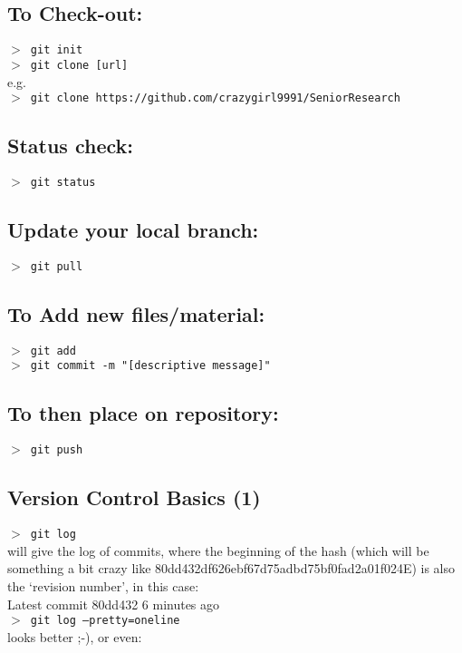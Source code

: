 \documentclass[11pt,a4paper]{article}
\begin{document}
    \subsection{To Check-out:}
   {\tt  $>$ git init\\
    $>$ git clone [url]} \\
     e.g.\\ 
    {\tt $>$ git clone https://github.com/crazygirl9991/SeniorResearch\\
   }

    \subsection{Status check:}
   {\tt $>$ git status}\\

 
    \subsection{Update your local branch:}
    {\tt $>$ git pull}\\


    \subsection{To Add new files/material:}
    {\tt $>$ git add\\
     $>$ git commit -m "[descriptive message]" } \\

   \subsection{To then place on repository:}
   {\tt $>$ git push }\\


   \subsection{Version Control Basics (1)}
   {\tt  $>$ git log}\\
   will give the log of commits, where the beginning of the hash
   (which will be something a bit crazy like 80dd432df626ebf67d75adbd75bf0fad2a01f024E)
   is also the `revision number', in this case: \\
   Latest commit 80dd432 6 minutes ago \\

   \noindent
   {\tt $>$ git log --pretty=oneline}\\ 
   looks better ;-), or even: \\
\end{document}
